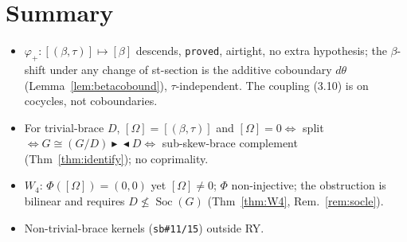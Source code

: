 \documentclass[11pt]{article}
\theoremstyle{definition}
\newcommand{\bic}{\blacktriangleright\!\!\blacktriangleleft}
\newcommand{\Soc}{\operatorname{Soc}}
\begin{document}
\section*{Summary}
\begin{itemize}\itemsep1pt
\item[\textbf{T1}] $\varphi_+:[(\beta,\tau)]\mapsto[\beta]$ descends, \texttt{proved}, airtight,
no extra hypothesis; the $\beta$-shift under any change of st-section is the additive coboundary
$d\theta$ (Lemma~\ref{lem:betacobound}), $\tau$-independent. The coupling (3.10) is on cocycles,
not coboundaries.
\item[\textbf{T2}] For trivial-brace $D$, $[\Omega]=[(\beta,\tau)]$ and
$[\Omega]=0\Leftrightarrow$ split $\Leftrightarrow G\cong(G/D)\bic D\Leftrightarrow$
sub-skew-brace complement (Thm~\ref{thm:identify}); no coprimality.
\item[\textbf{T3}] $W_4$: $\Phi([\Omega])=(0,0)$ yet $[\Omega]\neq0$; $\Phi$ non-injective; the
obstruction is bilinear and requires $D\not\le\Soc(G)$ (Thm~\ref{thm:W4}, Rem.~\ref{rem:socle}).
\item[\textbf{Open}] Non-trivial-brace kernels (\texttt{sb\#11/15}) outside RY.
\end{itemize}
\end{document}
